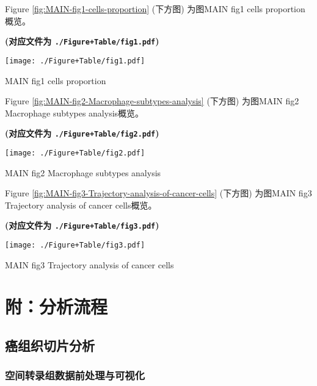 \documentclass[
]{article}
\begin{document}
Figure \ref{fig:MAIN-fig1-cells-proportion} (下方图) 为图MAIN fig1 cells proportion概览。

\textbf{(对应文件为 \texttt{./Figure+Table/fig1.pdf})}

\def\@captype{figure}
\begin{center}
\texttt{[image: ./Figure+Table/fig1.pdf]}
\caption{MAIN fig1 cells proportion}\label{fig:MAIN-fig1-cells-proportion}
\end{center}

Figure \ref{fig:MAIN-fig2-Macrophage-subtypes-analysis} (下方图) 为图MAIN fig2 Macrophage subtypes analysis概览。

\textbf{(对应文件为 \texttt{./Figure+Table/fig2.pdf})}

\def\@captype{figure}
\begin{center}
\texttt{[image: ./Figure+Table/fig2.pdf]}
\caption{MAIN fig2 Macrophage subtypes analysis}\label{fig:MAIN-fig2-Macrophage-subtypes-analysis}
\end{center}

Figure \ref{fig:MAIN-fig3-Trajectory-analysis-of-cancer-cells} (下方图) 为图MAIN fig3 Trajectory analysis of cancer cells概览。

\textbf{(对应文件为 \texttt{./Figure+Table/fig3.pdf})}

\def\@captype{figure}
\begin{center}
\texttt{[image: ./Figure+Table/fig3.pdf]}
\caption{MAIN fig3 Trajectory analysis of cancer cells}\label{fig:MAIN-fig3-Trajectory-analysis-of-cancer-cells}
\end{center}

\hypertarget{workflow}{%
\section{附：分析流程}\label{workflow}}

\hypertarget{ux764cux7ec4ux7ec7ux5207ux7247ux5206ux6790}{%
\subsection{癌组织切片分析}\label{ux764cux7ec4ux7ec7ux5207ux7247ux5206ux6790}}

\hypertarget{ux7a7aux95f4ux8f6cux5f55ux7ec4ux6570ux636eux524dux5904ux7406ux4e0eux53efux89c6ux5316}{%
\subsubsection{空间转录组数据前处理与可视化}\label{ux7a7aux95f4ux8f6cux5f55ux7ec4ux6570ux636eux524dux5904ux7406ux4e0eux53efux89c6ux5316}}
\end{document}
